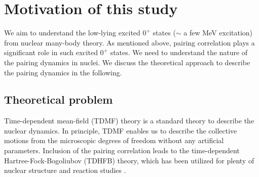 \documentclass[11pt]{book} %
\begin{document}

\section{Motivation of this study}
We aim to understand the low-lying excited $0^+$ states ($\sim$ a few MeV excitation) from nuclear many-body theory. As mentioned above, pairing correlation plays a significant role in such excited $0^+$ states. We need to understand the nature of the pairing dynamics in nuclei. We discuss the theoretical approach to describe the pairing dynamics in the following.

\subsection{Theoretical problem}

Time-dependent mean-field (TDMF) theory is a standard theory to describe the nuclear dynamics. In principle, TDMF enables us to describe the collective motions from the microscopic degrees of freedom without any artificial parameters. Inclusion of the pairing correlation leads to the time-dependent Hartree-Fock-Bogoliubov (TDHFB) theory, which has been utilized for plenty of nuclear structure and reaction studies \cite{NMMY16}.
\end{document}
